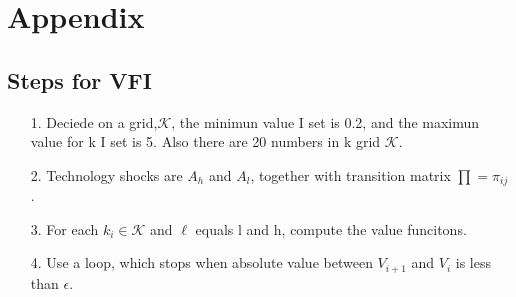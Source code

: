 \documentclass[12pt]{article}
\begin{document}
	\section{Appendix}
	\subsection{ Steps for VFI}
			\begin{enumerate}
			\item [1.] Deciede on a grid,$\mathscr{K}$, the minimun value I set is 0.2, and the maximun value for k I set is 5. Also there are 20 numbers in k grid $\mathscr{K}$.
			\item [2.] Technology shocks are $A_h$ and $A_l$, together with transition matrix $\prod=\pi_{ij}$.
			\item [3.] For each $k_i\in\mathscr{K}$ and $\ell$ equals l and h, compute the value funcitons.
			\item[4.] Use a loop, which stops when absolute value between $V_{i+1}$ and $V_i$ is less than $\epsilon$.	
		\end{enumerate}
\end{document}
